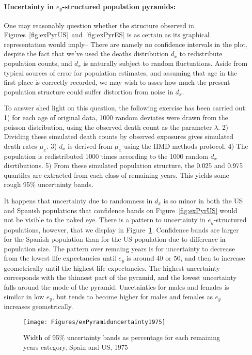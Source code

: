 \paragraph{Uncertainty in $e_y$-structured population pyramids:} One may
reasonably question whether the structure observed in
Figures~\ref{fig:exPyrUS}~and~\ref{fig:exPyrES} is as certain as its graphical
representation would imply-- There are namely no confidence intervals in the
plot, despite the fact that we've used the deaths distribution $d_x$ to
redistribute population counts, and $d_x$ is naturally subject to random
fluctuations. Aside from typical sources of error for population estimates, and
assuming that age in the first place is correctly recorded, we may wish to asses
how much the present population structure could suffer distortion from noise in
$d_x$. 

To answer shed light on this question, the following exercise has been
carried out: 1) for each age of original data, 1000 random deviates were drawn
from the poisson distribution, using the observed death count as the parameter
$\lambda$. 2) Dividing these simulated death counts by observed exposures gives
simulated death rates $\mu_x$. 3) $d_x$ is derived from $\mu_x$ using the HMD
methods protocol. 4) The population is redistributed 1000 times according to the
1000 random $d_x$ disrtibutions. 5) From these simulated population structure,
the 0.025 and 0.975 quantiles are extracted from each class of remaining years.
This yields some rough 95\% uncertainty bands.

It happens that uncertainty due to randomness in $d_x$ is so minor in both the
US and Spanish populations that confidence bands on Figure~\ref{fig:exPyrUS}
would not be visible to the naked eye. There is a pattern to uncertainty in
$e_y$-structured populations, however, that we display in
Figure~\ref{fig:PyramidUncertainty}. Confidence bands are larger for the Spanish
population than for the US population due to difference in population size. The
pattern over remaing years is for uncertainty to decrease from the lowest life
expectancies until $e_y$ is around 40 or 50, and then to
increase geometrically until the highest life expectancies. The highest
uncertainty corresponds with the thinnest part of the pyramid, and the lowest
uncertainty falls around the mode of the pyramid. Uncetainties for males and
females is similar in low $e_y$, but tends to become higher for males and
females as $e_y$ increases geometrically.

\begin{figure}
      \centering
      \caption{Width of 95\% uncertainty bands as percentage for each
      remaining years category, Spain and US, 1975}
         \texttt{[image: Figures/exPyramiduncertainty1975]}
      \label{fig:PyramidUncertainty} 
\end{figure}

